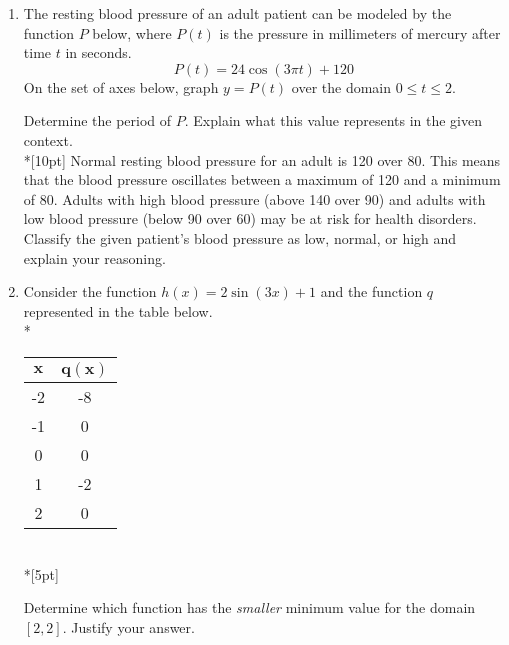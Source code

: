 \documentclass[12pt, oneside]{article}
\begin{document}
\begin{enumerate}
\item The resting blood pressure of an adult patient can be modeled by the function $P$ below, where $P(t)$ is the pressure in millimeters of mercury after time $t$ in seconds.
\[P(t) = 24\cos (3 \pi t) + 120\]
On the set of axes below, graph $y = P(t)$ over the domain $0 \leq t \leq 2$.
\begin{center}
\end{center}
Determine the period of $P$. Explain what this value represents in the given context.\\*[10pt]
Normal resting blood pressure for an adult is 120 over 80. This means that the blood pressure oscillates between a maximum of 120 and a minimum of 80. Adults with high blood pressure (above 140 over 90) and adults with low blood pressure (below 90 over 60) may be at risk for health disorders. Classify the given patient’s blood pressure as low, normal, or high and explain your reasoning.



\item Consider the function $h(x) = 2\sin(3x) + 1$ and the function $q$ represented in the table below.\\*
\begin{center}
\begin{tabular}{|c|c|}
    \hline 
    $\boldsymbol{x}$ & $\boldsymbol{q(x)}$\\ 
    \hline 
    -2 & -8 \\ 
    \hline 
    -1 & 0 \\ 
    \hline 
    0 & 0 \\ 
    \hline 
    1 & -2 \\ 
    \hline 
    2 & 0 \\ 
    \hline 
\end{tabular}\\*[5pt]
\end{center}
Determine which function has the \emph{smaller} minimum value for the domain $[ 2,2]$. Justify your answer. %


\end{enumerate}
\end{document}

